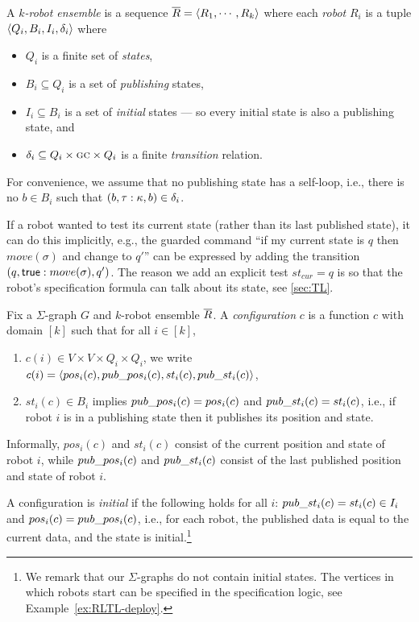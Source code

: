 %
A {\em $k$-robot ensemble} is a sequence $\overline{R} = \langle {R_1, \cdots, R_k} \rangle$ where each {\em robot} $R_i$ is a tuple $\langle {Q_i,B_i,I_i,\delta_i} \rangle$ where
\begin{itemize}
 \item $Q_i$ is a finite set of {\em states},
 \item $B_i \subseteq Q_i$ is a set of {\em publishing} states,
 \item $I_i \subseteq B_i$ is a set of {\em initial} states --- so every initial state is also a publishing state, and
 \item $\delta_i \subseteq Q_i \times \textsc{gc} \times Q_i$ is a finite {\em transition} relation.
\end{itemize}

For convenience, we assume that no publishing state has a self-loop, i.e., there is no $b \in B_i$ such that $(b,\tau:\kappa,b) \in \delta_i$.


\begin{remark}
If a robot wanted to test its current state (rather than its last published state),
it can do this implicitly, e.g., the guarded command ``if my current state is $q$ then $move(\sigma)$ and change to $q'$'' can be expressed by adding the
transition $(q,\mathsf{true}:move(\sigma),q')$. The reason we add an explicit test $st_{cur} = q$ is so that the robot's specification formula can talk about its state, see \ref{sec:TL}.
\end{remark}


%
Fix a $\Sigma$-graph $G$ and $k$-robot ensemble $\overline{R}$.
A {\em configuration} $c$ is a function $c$ with domain $[k]$ such that for all $i \in [k]$,
\begin{enumerate}
 \item $c(i) \in V \times V \times Q_i \times Q_i$, we write $c(i) =  \langle {pos_i(c), pub\_pos_i(c), st_i(c), pub\_st_i(c)} \rangle$,
 \item $st_i(c) \in B_i$ implies $pub\_pos_i(c) = pos_i(c)$ and $pub\_st_i(c) = st_i(c)$,
i.e., if robot $i$ is in a publishing state then it publishes its position and state.
\end{enumerate}


Informally, $pos_i(c)$ and $st_i(c)$ consist of the current position and state of robot $i$, while
$pub\_pos_i(c)$ and $pub\_st_i(c)$ consist of the last published position and state of robot $i$.

A configuration is {\em initial} if the following holds for all $i$: $pub\_st_i(c) = st_i(c) \in I_i$ and $pos_i(c) = pub\_pos_i(c)$, i.e., for each robot, the published data is equal to the current data, and the state is initial.\footnote{We remark that our $\Sigma$-graphs do not contain initial states. The vertices in which robots start can be specified in the specification logic, see Example~\ref{ex:RLTL-deploy}.}

